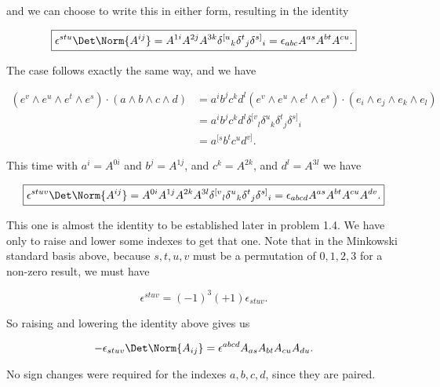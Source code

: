 and we can choose to write this in either form, resulting in the identity

\begin{equation}\label{eqn:relElectroDynProblemSet3:510}
\boxed{
\epsilon^{s t u} \Det \Norm{A^{ij}}
=
A^{1 i} A^{2 j} A^{3 k}
{\delta^{[u}}_k
{\delta^{t}}_j
{\delta^{s]}}_i
=
\epsilon_{a b c} A^{a s} A^{b t} A^{c u}.
}
\end{equation}

The  case follows exactly the same way, and we have

\begin{align*}
(e^v \wedge e^u \wedge e^t \wedge e^s) \cdot ( a \wedge b \wedge c \wedge d)
&=
a^i b^j c^k d^l
(e^v \wedge e^u \wedge e^t \wedge e^s) \cdot (e_i \wedge e_j \wedge e_k \wedge e_l) \\
&=
a^i b^j c^k d^l
{\delta^{[v}}_l
{\delta^{u}}_k
{\delta^{t}}_j
{\delta^{s]}}_i \\
&=
a^{[s} b^t c^{u} d^{v]}.
\end{align*}

This time with $a^i = A^{0 i}$ and $b^j = A^{1 j}$, and $c^k = A^{2 k}$, and $d^l = A^{3 l}$ we have

\begin{equation}\label{eqn:relElectroDynProblemSet3:530}
\boxed{
\epsilon^{s t u v} \Det \Norm{A^{ij}}
=
A^{0 i} A^{1 j} A^{2 k} A^{3 l}
{\delta^{[v}}_l
{\delta^{u}}_k
{\delta^{t}}_j
{\delta^{s]}}_i
=
\epsilon_{a b c d} A^{a s} A^{b t} A^{c u} A^{d v}.
}
\end{equation}

This one is almost the identity to be established later in problem 1.4.  We have only to raise and lower some indexes to get that one.  Note that in the Minkowski standard basis above, because $s, t, u, v$ must be a permutation of $0,1,2,3$ for a non-zero result, we must have

\begin{equation}\label{eqn:relElectroDynProblemSet3:550}
\epsilon^{s t u v} = (-1)^3 (+1) \epsilon_{s t u v}.
\end{equation}

So raising and lowering the identity above gives us

\begin{equation}\label{eqn:relElectroDynProblemSet3:570}
-\epsilon_{s t u v} \Det \Norm{A_{ij}}
=
\epsilon^{a b c d} A_{a s} A_{b t} A_{c u} A_{d u}.
\end{equation}

No sign changes were required for the indexes $a, b, c, d$, since they are paired.

